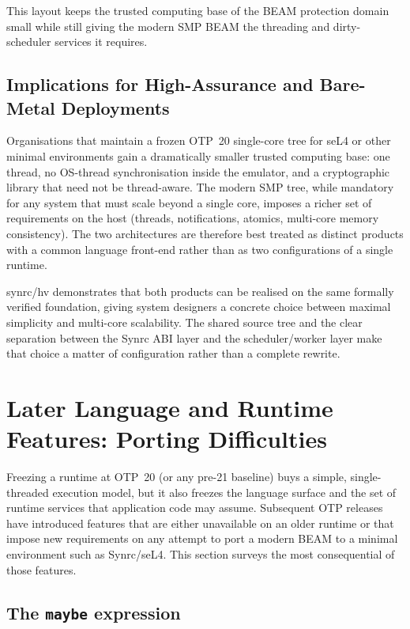 \documentclass{article}
\begin{document}
This layout keeps the trusted computing base of the BEAM protection domain small while still giving the modern SMP BEAM the threading and dirty-scheduler services it requires.

\subsection{Implications for High-Assurance and Bare-Metal Deployments}

Organisations that maintain a frozen OTP~20 single-core tree for seL4 or other minimal environments gain a dramatically smaller trusted computing base: one thread, no OS-thread synchronisation inside the emulator, and a cryptographic library that need not be thread-aware.
The modern SMP tree, while mandatory for any system that must scale beyond a single core, imposes a richer set of requirements on the host (threads, notifications, atomics, multi-core memory consistency).
The two architectures are therefore best treated as distinct products with a common language front-end rather than as two configurations of a single runtime.

synrc/hv demonstrates that both products can be realised on the same formally verified foundation, giving system designers a concrete choice between maximal simplicity and multi-core scalability.
The shared source tree and the clear separation between the Synrc ABI layer and the scheduler/worker layer make that choice a matter of configuration rather than a complete rewrite.

\section{Later Language and Runtime Features: Porting Difficulties}

Freezing a runtime at OTP~20 (or any pre-21 baseline) buys a simple, single-threaded execution model, but it also freezes the language surface and the set of runtime services that application code may assume.
Subsequent OTP releases have introduced features that are either unavailable on an older runtime or that impose new requirements on any attempt to port a modern BEAM to a minimal environment such as Synrc/seL4.
This section surveys the most consequential of those features.

\subsection{The \texttt{maybe} expression}
\end{document}
